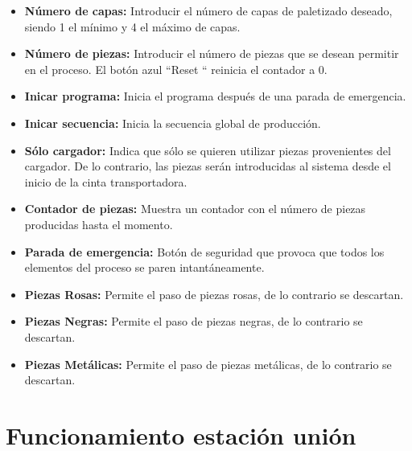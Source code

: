 \begin{itemize}
    \item \textbf{Número de capas:} Introducir el número de capas de paletizado deseado, siendo 1 el mínimo y 4 el máximo de capas.
    
    \item \textbf{Número de piezas:} Introducir el número de piezas que se desean permitir en el proceso. El botón azul ``Reset `` reinicia el contador a 0.
    
    \item \textbf{Inicar programa:} Inicia el programa después de una parada de emergencia.
    
    \item \textbf{Inicar secuencia:} Inicia la secuencia global de producción.
    
    \item \textbf{Sólo cargador:} Indica que sólo se quieren utilizar piezas provenientes del cargador. De lo contrario, las piezas serán introducidas al sistema desde el inicio de la cinta transportadora.
    
    \item \textbf{Contador de piezas:} Muestra un contador con el número de piezas producidas hasta el momento.
    
    \item \textbf{Parada de emergencia:} Botón de seguridad que provoca que todos los elementos del proceso se paren intantáneamente.
    
    \item \textbf{Piezas Rosas:} Permite el paso de piezas rosas, de lo contrario se descartan.
    
    \item \textbf{Piezas Negras:} Permite el paso de piezas negras, de lo contrario se descartan.
    
    \item \textbf{Piezas Metálicas:} Permite el paso de piezas metálicas, de lo contrario se descartan.

\end{itemize}



\section{Funcionamiento estación unión}
\label{sec:funcionamiento_union}

